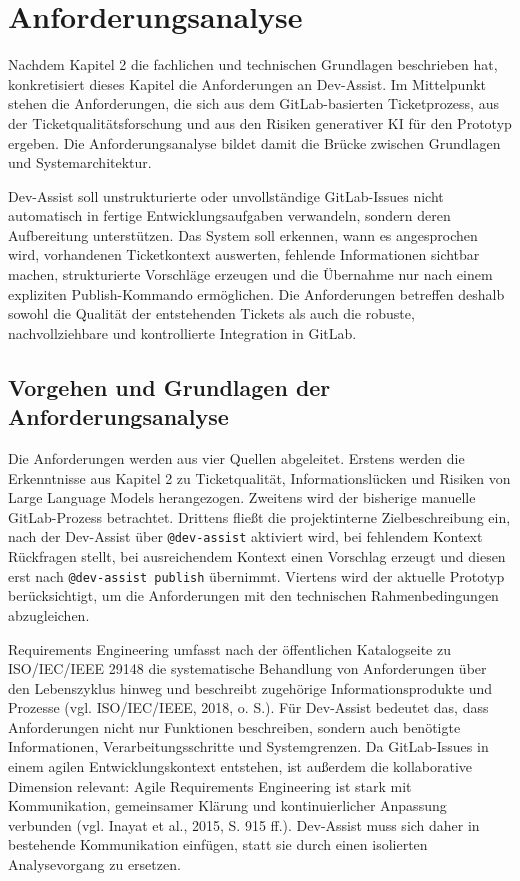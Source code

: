 \documentclass[12pt,a4paper,oneside]{scrreprt}
\begin{document}
\chapter{Anforderungsanalyse}

Nachdem Kapitel 2 die fachlichen und technischen Grundlagen beschrieben hat, konkretisiert dieses Kapitel die Anforderungen an Dev-Assist. Im Mittelpunkt stehen die Anforderungen, die sich aus dem GitLab-basierten Ticketprozess, aus der Ticketqualitätsforschung und aus den Risiken generativer KI für den Prototyp ergeben. Die Anforderungsanalyse bildet damit die Brücke zwischen Grundlagen und Systemarchitektur.

Dev-Assist soll unstrukturierte oder unvollständige GitLab-Issues nicht automatisch in fertige Entwicklungsaufgaben verwandeln, sondern deren Aufbereitung unterstützen. Das System soll erkennen, wann es angesprochen wird, vorhandenen Ticketkontext auswerten, fehlende Informationen sichtbar machen, strukturierte Vorschläge erzeugen und die Übernahme nur nach einem expliziten Publish-Kommando ermöglichen. Die Anforderungen betreffen deshalb sowohl die Qualität der entstehenden Tickets als auch die robuste, nachvollziehbare und kontrollierte Integration in GitLab.

\section{Vorgehen und Grundlagen der Anforderungsanalyse}

Die Anforderungen werden aus vier Quellen abgeleitet. Erstens werden die Erkenntnisse aus Kapitel 2 zu Ticketqualität, Informationslücken und Risiken von Large Language Models herangezogen. Zweitens wird der bisherige manuelle GitLab-Prozess betrachtet. Drittens fließt die projektinterne Zielbeschreibung ein, nach der Dev-Assist über \texttt{@dev-assist} aktiviert wird, bei fehlendem Kontext Rückfragen stellt, bei ausreichendem Kontext einen Vorschlag erzeugt und diesen erst nach \texttt{@dev-assist publish} übernimmt. Viertens wird der aktuelle Prototyp berücksichtigt, um die Anforderungen mit den technischen Rahmenbedingungen abzugleichen.

Requirements Engineering umfasst nach der öffentlichen Katalogseite zu ISO/IEC/\allowbreak IEEE 29148 die systematische Behandlung von Anforderungen über den Lebenszyklus hinweg und beschreibt zugehörige Informationsprodukte und Prozesse (vgl. ISO/IEC/IEEE, 2018, o. S.). Für Dev-Assist bedeutet das, dass Anforderungen nicht nur Funktionen beschreiben, sondern auch benötigte Informationen, Verarbeitungsschritte und Systemgrenzen. Da GitLab-Issues in einem agilen Entwicklungskontext entstehen, ist außerdem die kollaborative Dimension relevant: Agile Requirements Engineering ist stark mit Kommunikation, gemeinsamer Klärung und kontinuierlicher Anpassung verbunden (vgl. Inayat et al., 2015, S. 915 ff.). Dev-Assist muss sich daher in bestehende Kommunikation einfügen, statt sie durch einen isolierten Analysevorgang zu ersetzen.
\end{document}
